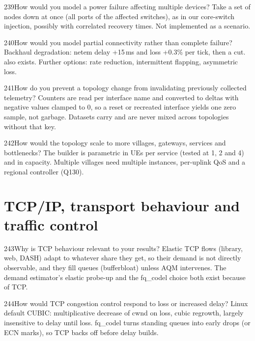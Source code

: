 \begin{qa}{239}{How would you model a power failure affecting multiple devices?}
Take a set of nodes down at once (all ports of the affected switches), as in our core-switch injection, possibly with
correlated recovery times. Not implemented as a scenario.
\end{qa}

\begin{qa}{240}{How would you model partial connectivity rather than complete failure?}
Backhaul degradation: netem delay +15\,ms and loss +0.3\% per tick, then a cut.  also exists.
Further options: rate reduction, intermittent flapping, asymmetric loss.
\end{qa}

\begin{qa}{241}{How do you prevent a topology change from invalidating previously collected telemetry?}
Counters are read per interface name and converted to deltas with negative values clamped to 0, so a reset or
recreated interface yields one zero sample, not garbage. Datasets carry  and are never mixed across
topologies without that key.
\end{qa}

\begin{qa}{242}{How would the topology scale to more villages, gateways, services and bottlenecks?}
The builder is parametric in UEs per service (tested at 1, 2 and 4) and in capacity. Multiple villages need multiple
 instances, per-uplink QoS and a regional controller (Q130).
\end{qa}

\section{TCP/IP, transport behaviour and traffic control}

\begin{qa}{243}{Why is TCP behaviour relevant to your results?}
Elastic TCP flows (library, web, DASH) adapt to whatever share they get, so their demand is not directly observable,
and they fill queues (bufferbloat) unless AQM intervenes. The demand estimator's elastic probe-up and the fq\_codel
choice both exist because of TCP.
\end{qa}

\begin{qa}{244}{How would TCP congestion control respond to loss or increased delay?}
Linux default CUBIC: multiplicative decrease of cwnd on loss, cubic regrowth, largely insensitive to delay until
loss. fq\_codel turns standing queues into early drops (or ECN marks), so TCP backs off before delay builds.
\end{qa}

